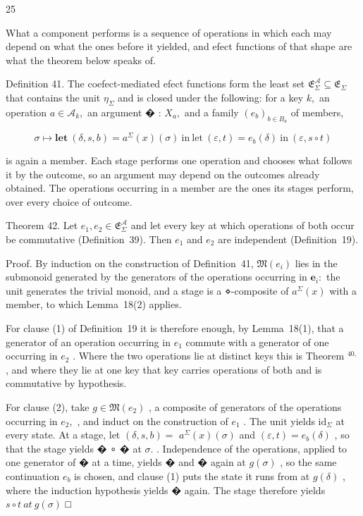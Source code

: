 \documentclass[
  10
]{article}
\begin{document}
25

What a component performs is a sequence of operations in which each may
depend on what the ones before it yielded, and efect functions of that
shape are what the theorem below speaks of.

Definition 41. The coefect-mediated efect functions form the least set
\({ \mathfrak { E } } _ { \Sigma } ^ { { \mathcal { A } } } \subseteq { \mathfrak { E } } _ { \Sigma }\)
that contains the unit \(\eta _ { \Sigma }\) and is closed under the
following: for a key \(k ,\) an operation
\(a \in { \mathcal { A } } _ { k } ,\) an argument � : \(X _ { a } ,\)
and a family \(\left( e _ { b } \right) _ { b \in B _ { a } }\) of
members,

\[
\sigma \mapsto \mathbf { l e t } ~ ( \delta , s , b ) = a ^ { \Sigma } ( x ) ( \sigma ) \mathrm { ~ i n ~ l e t ~ } ( \varepsilon , t ) = e _ { b } ( \delta ) \mathrm { ~ i n ~ } ( \varepsilon , s \circ t )\tag{36}
\]

is again a member. Each stage performs one operation and chooses what
follows it by the outcome, so an argument may depend on the outcomes
already obtained. The operations occurring in a member are the ones its
stages perform, over every choice of outcome.

Theorem 42. Let
\(e _ { 1 } , e _ { 2 } \in \mathfrak { E } _ { \Sigma } ^ { \mathcal { A } }\)
and let every key at which operations of both occur be commutative
(Definition~39). Then \(e _ { 1 }\) and \(e _ { 2 }\) are independent
(Definition~19).

Proof. By induction on the construction of Definition~41,
\({ \mathfrak { M } } ( e _ { i } )\) lies in the submonoid generated by
the generators of the operations occurring in
\(\boldsymbol { e } _ { i } { : }\) the unit generates the trivial
monoid, and a stage is a ⋄-composite of \(a ^ { \Sigma } ( x )\) with a
member, to which Lemma~18(2) applies.

For clause (1) of Definition~19 it is therefore enough, by Lemma~18(1),
that a generator of an operation occurring in \(e _ { 1 }\) commute with
a generator of one occurring in \(e _ { 2 }\) . Where the two operations
lie at distinct keys this is Theorem \(^ { 4 0 , }\) , and where they
lie at one key that key carries operations of both and is commutative by
hypothesis.

For clause (2), take \(g \in \mathfrak { M } ( e _ { 2 } )\) , a
composite of generators of the operations occurring in \(e _ { 2 } ,\) ,
and induct on the construction of \(e _ { 1 }\) . The unit yields
\(\mathrm { i d } _ { \Sigma }\) at every state. At a stage, let
\(( \delta , s , b ) =\) \(a ^ { \Sigma } ( x ) ( \sigma )\) and
\(( \varepsilon , t ) = e _ { b } ( \delta )\) , so that the stage
yields � ∘ � at \(\sigma .\) . Independence of the operations, applied
to one generator of � at a time, yields � and � again at
\(g ( \sigma )\) , so the same continuation \(e _ { b }\) is chosen, and
clause (1) puts the state it runs from at \(g ( \delta )\) , where the
induction hypothesis yields � again. The stage therefore yields
\(s \circ t \ a t \ g ( \sigma )\) □
\end{document}
